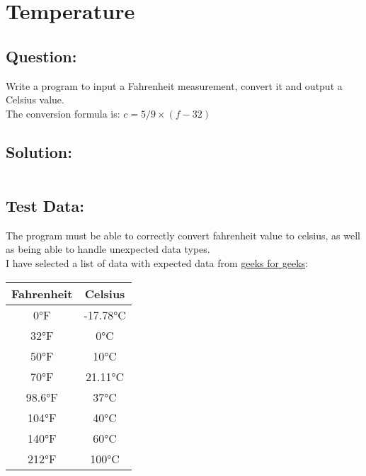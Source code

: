 \documentclass[main.tex]{subfiles}
\begin{document}
    \section{Temperature}
        \subsection*{Question:}
        Write a program to input a Fahrenheit measurement, convert it and output a Celsius value.\\
        The conversion formula is: \(c = 5 / 9 \times (f - 32)\)
            
        \subsection*{Solution:}
            \inputminted{C++}{../02-Temperature/Temperature.cpp}

        \newpage
        \subsection*{Test Data:}
            The program must be able to correctly convert fahrenheit value to celsius,
            as well as being able to handle unexpected data types.\\

            I have selected a list of data with expected data from \href{https://www.geeksforgeeks.org/fahrenheit-to-celsius-formula/}{geeks for geeks}:
            \begin{center}
                \begin{tabular}{c c}
                    \hline
                    \textbf{Fahrenheit} & \textbf{Celsius} \\
                    \hline
                    0°F & -17.78°C \\
                    32°F & 0°C \\
                    50°F & 10°C \\
                    70°F & 21.11°C \\
                    98.6°F & 37°C \\
                    104°F & 40°C \\
                    140°F & 60°C \\
                    212°F & 100°C \\
                    \hline
                \end{tabular}
            \end{center}
\end{document}
